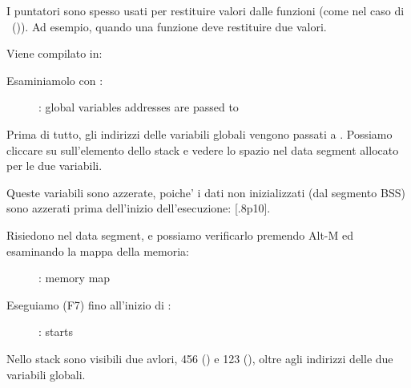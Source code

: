 \myindex{\CLanguageElements!\Pointers}
\label{label_pointers}

I puntatori sono spesso usati per restituire valori dalle funzioni (come nel caso di \scanf ~()).
Ad esempio, quando una funzione deve restituire due valori.




Viene compilato in:



\myindex{\olly}
\clearpage
Esaminiamolo con \olly:

\begin{figure}[H]
\centering
{}
\caption{\olly: 
global variables addresses are passed to \ttfone}
\label{fig:pointers_olly_global_1}
\end{figure}

Prima di tutto, gli indirizzi delle variabili globali vengono passati a \ttfone.
Possiamo cliccare su  sull'elemento dello stack e vedere lo spazio nel data segment allocato per le due variabili.

\clearpage
Queste variabili sono azzerate, poiche' i dati non inizializzati (dal segmento \ac{BSS}) sono azzerati prima dell'inizio dell'esecuzione: [.8p10].

Risiedono nel data segment, e possiamo verificarlo premendo Alt-M ed esaminando la mappa della memoria:

\begin{figure}[H]
\centering
{}
\caption{\olly: memory map}
\label{fig:pointers_olly_global_5}
\end{figure}

\clearpage
Eseguiamo (F7) fino all'inizio di \ttfone: 

\begin{figure}[H]
\centering
{}
\caption{\olly: \ttfone starts}
\label{fig:pointers_olly_global_2}
\end{figure}

Nello stack sono visibili due avlori, 456 () e
123 (), oltre agli indirizzi delle due variabili globali.

\clearpage

